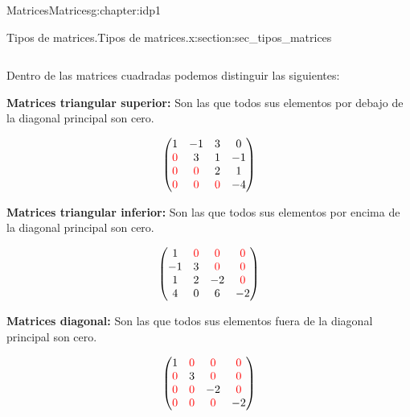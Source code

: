 \documentclass[oneside,12pt,]{book}
\newcommand{\terminology}[1]{\textbf{#1}}
\newcommand{\amp}{&}
\begin{document}
\begin{chapterptx}{Matrices}{}{Matrices}{}{}{g:chapter:idp1}
\begin{sectionptx}{Tipos de matrices.}{}{Tipos de matrices.}{}{}{x:section:sec_tipos_matrices}
\begin{enumerate}[label=\alph*]
\begin{enumerate}[label=(\roman*)]
\begin{equation*}
\end{equation*}
%
\end{enumerate}
%
\end{enumerate}
%
\par
Dentro de las matrices cuadradas podemos distinguir las siguientes:%
\par
\terminology{Matrices triangular superior:} Son las que todos sus elementos por debajo de la diagonal principal son cero.%
\par
%
\begin{equation*}
\begin{pmatrix} 
1 \amp -1 \amp 3 \amp 0  \\
\color{red}0 \amp 3  \amp 1 \amp -1  \\
\color{red}0 \amp \color{red}0 \amp 2 \amp 1 \\
\color{red}0 \amp \color{red}0  \amp \color{red}0 \amp -4  \\ 
\end{pmatrix} 
\end{equation*}
%
\par
\terminology{Matrices triangular inferior:} Son las que todos sus elementos por encima de la diagonal principal son cero.%
\par
%
\begin{equation*}
\begin{pmatrix}1 \amp \color{red}0 \amp \color{red}0 \amp \color{red}0  \\
-1 \amp 3  \amp \color{red}0 \amp \color{red}0  \\
1 \amp 2 \amp -2 \amp \color{red}0 \\
4 \amp 0  \amp 6 \amp -2  \\ 
\end{pmatrix} 
\end{equation*}
%
\par
\terminology{Matrices diagonal:} Son las que todos sus elementos fuera de la diagonal principal son cero.%
\par
%
\begin{equation*}
\begin{pmatrix} 1 \amp \color{red}0 \amp \color{red}0 \amp \color{red}0  \\
\color{red}0 \amp 3  \amp \color{red}0 \amp \color{red}0  \\
\color{red}0 \amp \color{red}0 \amp -2 \amp \color{red}0 \\
\color{red}0 \amp \color{red}0  \amp \color{red}0 \amp -2  \\ 
\end{pmatrix}

\end{equation*}
\end{sectionptx}
\end{chapterptx}
\end{document}
